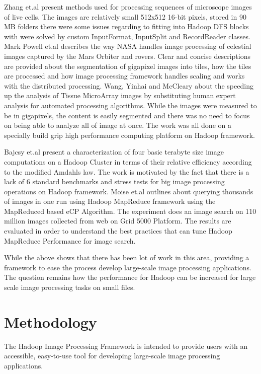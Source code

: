 \documentclass[conference]{IEEEtran}
\begin{document}
Zhang et.al \cite{Zhang2010} present methods used for processing sequences of microscope images of live cells. The images are relatively small 512x512 16-bit pixels, stored in 90 MB folders there were some issues regarding to fitting into Hadoop DFS blocks with were solved by custom InputFormat, InputSplit and RecordReader classes. Mark Powell et.al \cite{Powell2010} describes the way NASA handles image processing of celestial images captured by the Mars Orbiter and rovers. Clear and concise descriptions are provided about the segmentation of gigapixel images into tiles, how the tiles are processed and how image processing framework handles scaling and works with the distributed processing. Wang, Yinhai and McCleary\cite{Wang2011} about the speeding up the analysis of Tissue MicroArray images by substituting human expert analysis for automated processing algorithms. While the images were measured to be in gigapixels, the content is easily segmented and there was no need to focus on being able to analyze all of image at once. The work was all done on a specially build grip high performance	computing platform on Hadoop framework. 

Bajcsy et.al \cite{Bajcsy2013} present a characterization of four basic terabyte size image computations on a Hadoop Cluster in terms of their relative efficiency according to the modified Amdahls law. The work is motivated by the fact that there is a lack of 6 standard benchmarks and stress tests for big image processing operations on Hadoop framework. Moise et.al \cite{Moise2013} outlines about querying thousands of images in one run using Hadoop MapReduce framework using the MapReduced based eCP Algorithm. The experiment does an image search on 110 million images collected from web on Grid 5000 Platform. The results are evaluated in order to understand the best practices that can tune Hadoop MapReduce Performance for image search.	

While the above shows that there has been lot of work in this area, providing a framework to ease the process develop large-scale image processing applications. The question remains how the performance for Hadoop can be increased for large scale image processing tasks on small files.
	
\section{Methodology}
The Hadoop Image Processing Framework is intended to provide users
with an accessible, easy-to-use tool for developing large-scale image
processing applications.
\end{document}
